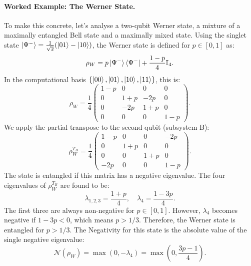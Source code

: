 \paragraph{Worked Example: The Werner State.}
To make this concrete, let's analyse a two-qubit Werner state, a mixture
of a maximally entangled Bell state and a maximally mixed state. Using the
singlet state $\ket{\Psi^-} = \frac{1}{\sqrt{2}}(\ket{01}-\ket{10})$, the
Werner state is defined for $p \in [0, 1]$ as:
\begin{equation}
	\rho_W = p \ket{\Psi^-}\bra{\Psi^-} + \frac{1-p}{4} \mathbb{I}_4.
\end{equation}
In the computational basis $\{\ket{00}, \ket{01}, \ket{10}, \ket{11}\}$, this is:
\begin{equation}
	\rho_W = \frac{1}{4}
	\begin{pmatrix}
		1-p & 0 & 0 & 0 \\
		0 & 1+p & -2p & 0 \\
		0 & -2p & 1+p & 0 \\
		0 & 0 & 0 & 1-p
	\end{pmatrix}.
\end{equation}
We apply the partial transpose to the second qubit (subsystem B):
\begin{equation}
	\rho_W^{T_B} = \frac{1}{4}
	\begin{pmatrix}
		1-p & 0 & 0 & -2p \\
		0 & 1+p & 0 & 0 \\
		0 & 0 & 1+p & 0 \\
		-2p & 0 & 0 & 1-p
	\end{pmatrix}.
\end{equation}
The state is entangled if this matrix has a negative eigenvalue. The four
eigenvalues of $\rho_W^{T_B}$ are found to be:
\begin{equation}
	\lambda_{1,2,3} = \frac{1+p}{4}, \quad \lambda_4 = \frac{1-3p}{4}.
\end{equation}
The first three are always non-negative for $p \in [0,1]$. However,
$\lambda_4$ becomes negative if $1-3p < 0$, which means $p > 1/3$.
Therefore, the Werner state is entangled for $p > 1/3$. The Negativity for
this state is the absolute value of the single negative eigenvalue:
\begin{equation}
	\mathcal{N}(\rho_W) = \max\left(0, -\lambda_4\right) = \max\left(0, \frac{3p-1}{4}\right).
\end{equation}

